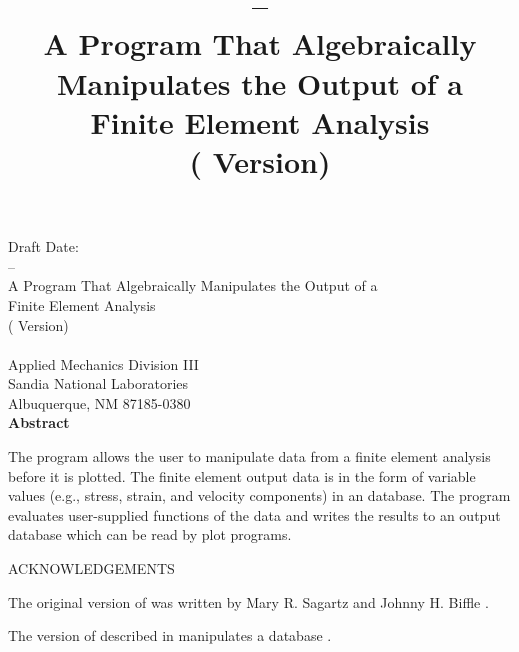 \newif\ifdraft\drafttrue
\newif\ifsand\sandfalse

\SANDprintDate{\today}
\newcommand{\theTitle}{\caps{\PROGRAM} -- \\
A Program That Algebraically Manipulates the Output of a \\
Finite Element Analysis \\
(\exo{} Version)}
\title{\theTitle}
\ifsand
\pdfbookmark[1]{Cover}{cover}
\doCover
\newpage
\else
{}
\setcounter{page}{3}
\fi


\begin{center}
\ifdraft
Draft Date: \SANDprintDateVar\\
\else
Printed \SANDprintDateVar\\
\fi

\vspace{0.75in}
\theTitle\\
\vspace{0.75in}
\SANDauthorVar\\
Applied Mechanics Division III\\
Sandia National Laboratories\\
Albuquerque, NM 87185-0380\\
\vspace*{.5in}
\textbf{Abstract}
\end{center}
The \caps{\PROGRAM} program allows the user to manipulate data from a
finite element analysis before it is plotted. The finite element output
data is in the form of variable values (e.g., stress, strain, and
velocity components) in an \exo{} database. The \caps{\PROGRAM} program
evaluates user-supplied functions of the data and writes the results to
an output \exo{} database which can be read by plot programs.
\newpage
\begin{center} ACKNOWLEDGEMENTS \end{center}

The original version of \caps{\PROGRAM} was written by Mary R. Sagartz
and Johnny H. Biffle \cite{bib:oldalg}.

The version of \caps{\PROGRAM} described in \cite{bib:seaalg}
manipulates a  database \cite{bib:seaco}.


